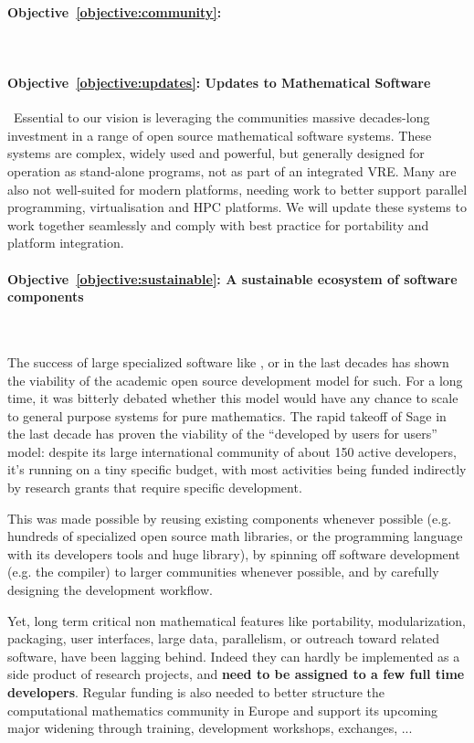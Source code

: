 \documentclass[noworkareas,deliverables,gitinfo,compactht]{euproposal}
\begin{document}
\begin{proposal}
\paragraph{Objective~\ref{objective:community}: }\ 

\paragraph{Objective~\ref{objective:updates}: Updates to Mathematical Software}\ 
Essential to our vision is leveraging the communities massive
decades-long investment in a range of open source mathematical
software systems. These systems are complex, widely used and powerful,
but generally designed for operation as stand-alone programs, not as
part of an integrated VRE. Many are also not well-suited for modern
platforms, needing work to better support parallel programming,
virtualisation and HPC platforms. We will update these systems to work
together seamlessly and comply with best practice for portability and
platform integration.


\paragraph{Objective~\ref{objective:sustainable}: A sustainable
  ecosystem of software components}\ 

The success of large specialized software like \PariGP, \Singular or
\GAP in the last decades has shown the viability of the academic open
source development model for such. For a long time, it was bitterly
debated whether this model would have any chance to scale to general
purpose systems for pure mathematics. The rapid takeoff of Sage in the
last decade has proven the viability of the ``developed by users for
users'' model: despite its large international community of about 150
active developers, it's running on a tiny specific budget, with most
activities being funded indirectly by research grants that require
specific development.

This was made possible by reusing existing components whenever
possible (e.g. hundreds of specialized open source math libraries, or
the \Python programming language with its developers tools and huge
library), by spinning off software development (e.g. the \Cython
compiler) to larger communities whenever possible, and by carefully
designing the development workflow.

Yet, long term critical non mathematical features like portability,
modularization, packaging, user interfaces, large data, parallelism,
or outreach toward related software, have been lagging behind. Indeed
they can hardly be implemented as a side product of research projects,
and \textbf{need to be assigned to a few full time developers}. Regular
funding is also needed to better structure the computational
mathematics community in Europe and support its upcoming major
widening through training, development workshops, exchanges, ...


\end{proposal}
\end{document}
